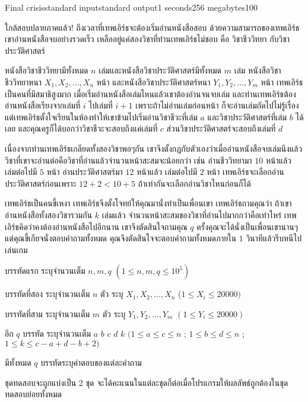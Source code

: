 \documentclass[11pt,a4paper]{article}
\begin{document}
 
\begin{problem}{Final crisis}{standard input}{standard output}{1 seconds}{256 megabytes}{100}
 
ใกล้สอบปลายภาคแล้ว! ถึงเวลาที่เทพเอิร์ธจะต้องเริ่มอ่านหนังสือสอบ ด้วยความสามารถของเทพเอิร์ธ เขาอ่านหนังสือจบอย่างรวดเร็ว เหลืออยู่แค่สองวิชาที่ท่านเทพเอิร์ธไม่ชอบ คือ วิชาชีววิทยา กับวิชาประวัติศาสตร์
 
 หนังสือวิชาชีววิทยามีทั้งหมด $n$ เล่มและหนังสือวิชาประวัติศาสตร์มีทั้งหมด $m$ เล่ม หนังสือวิชาชีววิทยาหนา $X_1, X_2, ..., X_n $ หน้า และหนังสือวิชาประวัติศาสตร์หนา $Y_1, Y_2, ..., Y_m$ หน้า เทพเอิร์ธเป็นคนที่มีสมาธิสูงมาก เมื่อเริ่มอ่านหนังสือเล่มไหนแล้วเขาต้องอ่านจนจบเล่ม และท่านเทพเอิร์ธต้องอ่านหนังสือเรียงจากเล่มที่ $i$ ไปเล่มที่ $i+1$ เพราะถ้าไม่อ่านเล่มก่อนหน้า ก็จะอ่านเล่มถัดไปไม่รู้เรื่อง แต่เทพเอิร์ธตั้งใจเรียนในห้องทำให้เขาข้ามไปเริ่มอ่านวิชาชีวะที่เล่ม $a$ และวิชาประวัติศาสตร์ที่เล่ม $b$ ได้เลย และคุณครูก็ได้บอกว่าวิชาชีวะจะสอบถึงแค่เล่มที่ $c$ ส่วนวิชาประวัติศาสตร์จะสอบถึงเล่มที่ $d$
 
เนื่องจากท่านเทพเอิร์ธเกลียดทั้งสองวิชาพอๆกัน เขาจึงตั้งกฎกับตัวเองว่าเมื่ออ่านหนังสือจบเล่มนึงแล้ววิชาที่เขาจะอ่านต่อคือวิชาที่อ่านแล้วจำนวนหน้าสะสมจะน้อยกว่า เช่น อ่านชีววิทยามา $10$ หน้าแล้ว เล่มต่อไปมี $5$ หน้า อ่านประวัติศาสตร์มา $12$ หน้าแล้ว เล่มต่อไปมี $2$ หน้า เทพเอิร์ธจะเลือกอ่านประวัติศาสตร์ก่อนเพราะ $12+2 < 10+5$ ถ้าเท่ากันจะเลือกอ่านวิชาไหนก่อนก็ได้
 
เทพเอิร์ธเป็นคนขี้เหงา เทพเอิร์ธจึงตั้งโจทย์ให้คุณมานั่งทำเป็นเพื่อนเขา เทพเอิร์ธถามคุณว่า ถ้าเขาอ่านหนังสือทั้งสองวิชารวมกัน $k$ เล่มแล้ว จำนวนหน้าสะสมของวิชาที่อ่านไปมากกว่าคือเท่าไหร่ เทพเอิร์ธคิดว่าคงต้องอ่านหนังสือไปอีกนาน เขาจึงตัดสินใจถามคุณ $q$ ครั้งคุณจะได้นั่งเป็นเพื่อนเขานานๆ แต่คุณขี้เกียจนั่งตอบคำถามทั้งหมด คุณจึงตัดสินใจจะตอบคำถามทั้งหมดภายใน $1$ วินาทีแล้วรีบหนีไปเล่นเกม
 
 
\InputFile
บรรทัดแรก ระบุจำนวนเต็ม $ n,m,q$ $( 1\leq n,m,q\leq10^5)$
 
บรรทัดที่สอง ระบุจำนวนเต็ม $n$ ตัว ระบุ $X_1, X_2, ..., X_n$ ($1\leq X_i\leq20000
)$
 
บรรทัดที่สาม ระบุจำนวนเต็ม $m$ ตัว ระบุ $Y_1,Y_2,...,Y_m$ $(1\leq Y_i\leq 20000)$
 
อีก $q$ บรรทัด ระบุจำนวนเต็ม $a$ $b$ $c$ $d$ $k$ $(1\leq a\leq c\leq n $ ; $1\leq b\leq d\leq n $ ; $ 1\leq k\leq c-a+d-b+2)$
 
 
\OutputFile
มีทั้งหมด $q$ บรรทัดระบุคำตอบของแต่ละคำถาม
 
\Scoring
ชุดทดสอบจะถูกแบ่งเป็น 2 ชุด จะได้คะแนนในแต่ละชุดก็ต่อเมื่อโปรแกรมให้ผลลัพธ์ถูกต้องในชุดทดสอบย่อยทั้งหมด
 

\end{problem}
\end{document}
